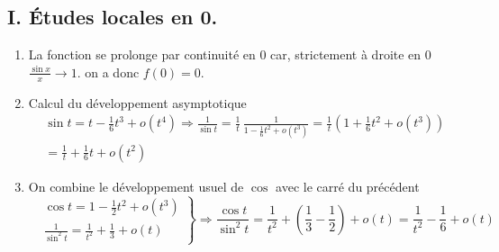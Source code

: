 \subsection*{I. \'Etudes locales en 0.}
\begin{enumerate}
  \item La fonction se prolonge par continuité en $0$ car, strictement à droite en 0  $\frac{\sin x}{x}\rightarrow 1$. on a donc $f(0)=0$.
 
  \item Calcul du développement asymptotique
\begin{multline*}
\sin t= t - \frac{1}{6}t^3 + o(t^4) \Rightarrow
\frac{1}{\sin t} = \frac{1}{t}\,\frac{1}{1-\frac{1}{6}t^2 + o(t^3)}
= \frac{1}{t}\left(1+\frac{1}{6}t^2 + o(t^3) \right)\\
= \frac{1}{t} +\frac{1}{6}t + o(t^2)
\end{multline*}

  \item On combine le développement usuel de $\cos$ avec le carré du précédent
\begin{displaymath}
\left. 
\begin{aligned}
&\cos t = 1 - \frac{1}{2}t^2 + o(t^3)\\
&\frac{1}{\sin^2 t} = \frac{1}{t^2} + \frac{1}{3} + o(t)
\end{aligned}
\right\rbrace 
\Rightarrow
\frac{\cos t}{\sin ^2 t}
= \frac{1}{t^2} +\left(\frac{1}{3}-\frac{1}{2} \right) + o(t)
= \frac{1}{t^2} -\frac{1}{6} + o(t)
\end{displaymath}


\end{enumerate}
